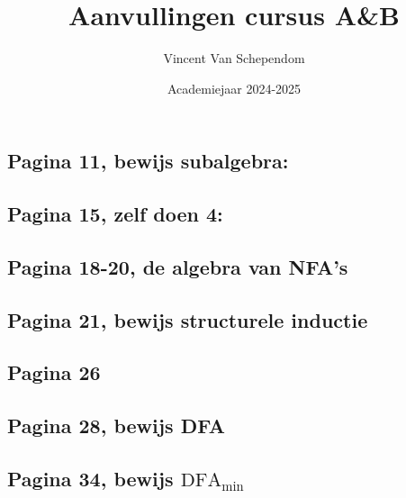 \documentclass[kulak]{kulakarticle}
\title{Aanvullingen cursus A\&B}
\author{Vincent Van Schependom}
\date{Academiejaar 2024-2025}
\newcommand{\DFA}{\text{DFA}}
\theoremstyle{definition}
\begin{document}
	\maketitle

	\subsection*{Pagina 11, bewijs subalgebra:}

	

	\subsection*{Pagina 15, zelf doen 4:}

	

	\subsection*{Pagina 18-20, de algebra van NFA's}

	

	\subsection*{Pagina 21, bewijs structurele inductie}

	

	\subsection*{Pagina 26}

	

	\subsection*{Pagina 28, bewijs DFA}

	

	\subsection*{Pagina 34, bewijs \( \DFA_{\text{min}} \)}

	
\end{document}
